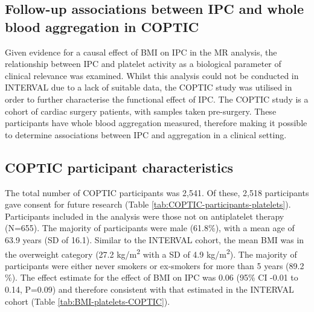 \documentclass[11pt,twoside]{bristolthesis}
\begin{document}
\hypertarget{follow-up-associations-between-ipc-and-whole-blood-aggregation-in-coptic}{%
\subsection{Follow-up associations between IPC and whole blood aggregation in COPTIC}\label{follow-up-associations-between-ipc-and-whole-blood-aggregation-in-coptic}}

Given evidence for a causal effect of BMI on IPC in the MR analysis, the relationship between IPC and platelet activity as a biological parameter of clinical relevance was examined. Whilst this analysis could not be conducted in INTERVAL due to a lack of suitable data, the COPTIC study was utilised in order to further characterise the functional effect of IPC. The COPTIC study is a cohort of cardiac surgery patients, with samples taken pre-surgery. These participants have whole blood aggregation measured, therefore making it possible to determine associations between IPC and aggregation in a clinical setting.

\hypertarget{coptic-participant-characteristics}{%
\subsection{COPTIC participant characteristics}\label{coptic-participant-characteristics}}

The total number of COPTIC participants was 2,541. Of these, 2,518 participants gave consent for future research (Table \ref{tab:COPTIC-participants-platelets}). Participants included in the analysis were those not on antiplatelet therapy (N=655). The majority of participants were male (61.8\%), with a mean age of 63.9 years (SD of 16.1). Similar to the INTERVAL cohort, the mean BMI was in the overweight category (27.2 kg/m\textsuperscript{2} with a SD of 4.9 kg/m\textsuperscript{2}). The majority of participants were either never smokers or ex-smokers for more than 5 years (89.2 \%). The effect estimate for the effect of BMI on IPC was 0.06 (95\% CI -0.01 to 0.14, P=0.09) and therefore consistent with that estimated in the INTERVAL cohort (Table \ref{tab:BMI-platelets-COPTIC}).
\end{document}
